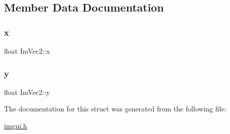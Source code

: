 \subsection{Member Data Documentation}
\mbox{\label{struct_im_vec2_a5802a68560961ed8cb8cc5fb2a244c2d}} 
\subsubsection{\texorpdfstring{x}{x}}
{\footnotesize\ttfamily float Im\+Vec2\+::x}

\mbox{\label{struct_im_vec2_a1f9d136ca837e147b793b19d25a3a618}} 
\subsubsection{\texorpdfstring{y}{y}}
{\footnotesize\ttfamily float Im\+Vec2\+::y}



The documentation for this struct was generated from the following file\+:\begin{DoxyCompactItemize}
\item 
\mbox{\hyperlink{imgui_8h}{imgui.\+h}}\end{DoxyCompactItemize}
